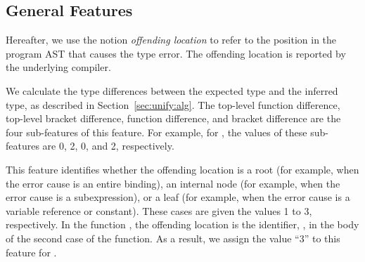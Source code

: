 \documentclass[12pt]{report}	%
\begin{document}
\subsection{General Features}
\label{sec:feature-vector:general}

Hereafter, we use the notion \emph{offending location} to refer to the 
position in the program AST that causes the type error. 
The offending location is reported by the underlying 
compiler.

We calculate the type differences between the expected type
and the inferred type,
as described in Section~\ref{sec:unify:alg}.
The 
top-level function difference,
top-level bracket difference, 
function difference, and
bracket difference
are the four sub-features of this feature.
For example, for , the values of these sub-features
are 0, 2, 0, and 2, respectively.

%
This feature identifies whether 
the offending location is a root (for example, when the
error cause is an entire binding),
an internal node (for example, when the error cause is
a subexpression), or a leaf (for example, when the error cause
is a variable reference or constant). These cases are given the
values 1 to 3, respectively.
In the function ,
the offending location is the identifier, 
, in the body of the second case of the
function.
As a result, we assign the value ``3'' to 
this feature for .
\end{document}
